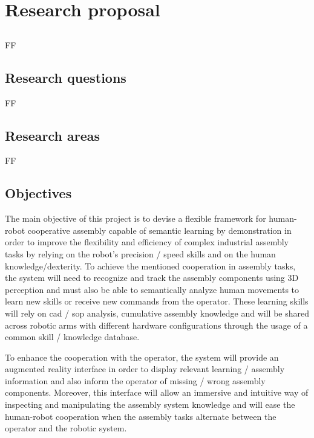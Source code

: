 \chapter{Research proposal}\label{chap:research-proposal}



\section*{}

FF



\section{Research questions}

FF


\section{Research areas}

FF


\section{Objectives}

The main objective of this project is to devise a flexible framework for human-robot cooperative assembly capable of semantic learning by demonstration in order to improve the flexibility and efficiency of complex industrial assembly tasks by relying on the robot's precision / speed skills and on the human knowledge/dexterity. To achieve the mentioned cooperation in assembly tasks, the system will need to recognize and track the assembly components using 3D perception and must also be able to semantically analyze human movements to learn new skills or receive new commands from the operator. These learning skills will rely on \gls{cad} / \gls{sop} analysis, cumulative assembly knowledge and will be shared across robotic arms with different hardware configurations through the usage of a common skill / knowledge database.

To enhance the cooperation with the operator, the system will provide an augmented reality interface in order to display relevant learning / assembly information and also inform the operator of missing / wrong assembly components. Moreover, this interface will allow an immersive and intuitive way of inspecting and manipulating the assembly system knowledge and will ease the human-robot cooperation when the assembly tasks alternate between the operator and the robotic system.

